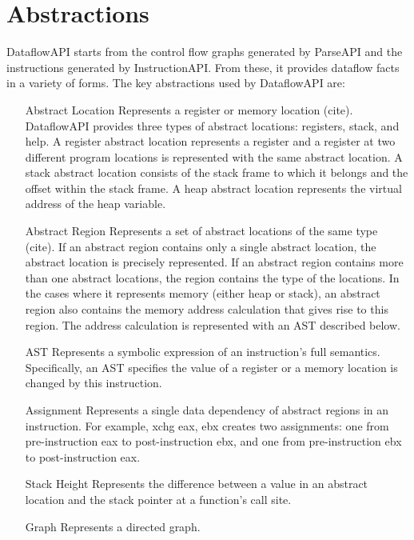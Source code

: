 \section{Abstractions}
\label{sec:abstractions}

DataflowAPI starts from the control flow graphs generated by ParseAPI and the instructions generated by InstructionAPI.
From these, it provides dataflow facts in a variety of forms. The key abstractions used by DataflowAPI are:

\begin{itemize}
\item[Abstract Location] Represents a register or memory location (cite).
DataflowAPI provides three types of abstract locations: registers, stack, and
help. A register abstract location represents a register and a register at two
different program locations is represented with the same abstract location. 
A stack abstract location consists of the stack frame to which it belongs and
the offset within the stack frame. 
A heap abstract location represents the virtual address of the heap variable. 

\item[Abstract Region] Represents a set of abstract locations of the same type
(cite). If an abstract region contains only a single abstract location, the
abstract location is precisely represented. 
If an abstract region contains more than one abstract locations, the region
contains the type of the locations. In the cases where it represents memory
(either heap or stack), an abstract region also contains 
the memory address calculation that gives rise to this region. 
The address calculation is represented with an AST described below.

\item[AST] Represents a symbolic expression of an instruction's full semantics.
Specifically, an AST specifies the value of a register or a memory location is changed by this
instruction.

\item[Assignment] Represents a single data dependency of abstract regions in an instruction. For example, xchg eax, ebx creates two assignments: one from pre-instruction eax to post-instruction ebx, and one from pre-instruction ebx to post-instruction eax.

\item[Stack Height] Represents the difference between a value in an abstract location and the stack pointer at a function's call site.
\item[Graph] Represents a directed graph.
\end{itemize}


